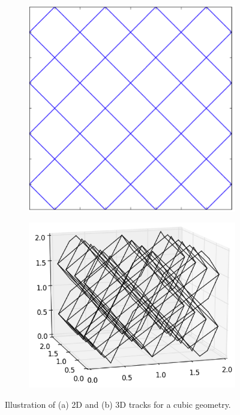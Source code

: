 \begin{figure}[h!]
	\centering
	\begin{subfigure}{0.25\textwidth}
		\centering
		\includegraphics[width=\linewidth]{figures/laydown/sample-tracks_a.png}
		\caption{}
		\label{fig:sample-tracks-a}
	\end{subfigure}
	\begin{subfigure}{0.35\textwidth}
		\centering
		\includegraphics[width=\linewidth]{figures/laydown/sample-tracks_b.png}
		\caption{}
		\label{fig:sample-tracks-b}
	\end{subfigure}
	\caption[]{Illustration of (a) 2D and (b) 3D  tracks for a cubic geometry.}
	\label{fig:sample-tracks}
\end{figure}


